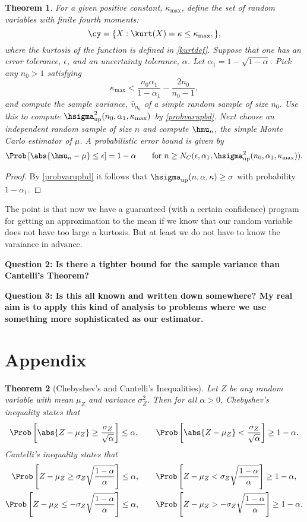 \documentclass[12pt]{amsart}
\newcommand{\hv}{\hat{v}}
\newtheorem{theorem}{Theorem}
\begin{document}
\begin{theorem} For a given positive constant, $\kappa_{\max}$, define the set of random variables with finite fourth moments:
\[
\cy = \{X : \kurt(X)= \kappa \le \kappa_{\max}, \},
\]
where the kurtosis of the function is defined in \eqref{kurtdef}.
Suppose that one has an error tolerance, $\epsilon$, and an uncertainty tolerance, $\alpha$.  Let $\alpha_1 = 1 - \sqrt{1 - \alpha}$.  Pick any $n_0>1$ satisfying 
\[
\kappa_{\max} < \frac{n_0 \alpha_1}{1-\alpha_1} - \frac{2n_0}{n_0-1},
\]
and compute the sample variance, $\hv_{n_0}$ of a simple random sample of size $n_0$.  Use this to compute $\hsigma^2_{\text{\rm up}}(n_0,\alpha_1,\kappa_{\max})$ by \eqref{probvarupbd}.
Next choose an independent random sample of size $n$ and compute $\hmu_n$, the simple Monte Carlo estimator of $\mu$.  A probabilistic error bound is given by 
\[
\Prob\left[\abs{\hmu_n-\mu} \le \epsilon \right] = 1-\alpha \qquad \text{for } n\ge N_{C}(\epsilon,\alpha_1,\hsigma^2_{\text{\rm up}}(n_0,\alpha_1,\kappa_{\max})).
\]
\end{theorem}
\begin{proof} By \eqref{probvarupbd} it follows that $\hsigma_{\text{up}}(n,\alpha,\kappa)  \ge \sigma$ with probability $1-\alpha_1$.  

\end{proof}

The point is that now we have a guaranteed (with a certain confidence) program for getting an approximation to the mean if we know that our random variable does not have too large a kurtosis.  But at least we do not have to know the varaiance in advance.

{\bf Question 2:  Is there a tighter bound for the sample variance than Cantelli's Theorem?}

{\bf Question 3:  Is this all known and written down somewhere?  My real aim is to apply this kind of analysis to problems where we use something more sophisticated as our estimator.}

\section*{Appendix}
\begin{theorem}[Chebyshev's and Cantelli's Inequalities] \label{Chebineqthm} Let $Z$ be any random variable with mean $\mu_Z$ and variance $\sigma^2_{Z}$.  Then for all $\alpha >0$, Chebyshev's inequality states that
\[
\Prob\left[\abs{Z-\mu_Z} \ge \frac{\sigma_Z}{\sqrt{\alpha}} \right] \le \alpha, \qquad \Prob\left[\abs{Z-\mu_Z} < \frac{\sigma_Z}{\sqrt{\alpha}} \right] \ge 1-\alpha.
\]
Cantelli's inequality states that
\begin{gather*}
\Prob\left[Z-\mu_Z \ge \sigma_Z \sqrt{\frac{1-\alpha}{\alpha}} \right] \le \alpha, \qquad \Prob\left[Z-\mu_Z < \sigma_Z \sqrt{\frac{1-\alpha}{\alpha}} \right] \ge 1-\alpha, \\
\Prob\left[Z-\mu_Z \le - \sigma_Z \sqrt{\frac{1-\alpha}{\alpha}} \right] \le \alpha, \qquad \Prob\left[Z-\mu_Z > -\sigma_Z \sqrt{\frac{1-\alpha}{\alpha}} \right] \ge 1-\alpha.
\end{gather*}
\end{theorem}
\end{document}
